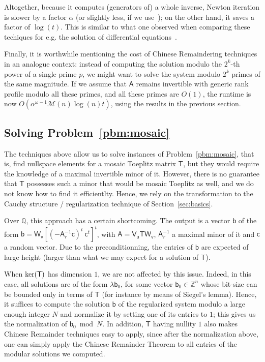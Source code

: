 \documentclass{sig-alternate}
\newcommand{\vb}{\ensuremath{\mathsf{b}}}
\newcommand{\vc}{\ensuremath{\mathsf{c}}}
\newcommand{\vu}{\ensuremath{\mathsf{u}}}
\newcommand{\vv}{\ensuremath{\mathsf{v}}}
\newcommand{\mA}{\ensuremath{\mathsf{A}}}
\newcommand{\mT}{\ensuremath{\mathsf{T}}}
\newcommand{\mV}{\ensuremath{\mathsf{V}}}
\newcommand{\mW}{\ensuremath{\mathsf{W}}}
\newcommand{\Q}{\ensuremath{\mathbb{Q}}}
\newcommand{\Z}{\ensuremath{\mathbb{Z}}}
\newcommand{\M}{\ensuremath{\mathscr{M}}}
\begin{document}
Altogether, because it computes (generators of) a whole inverse,
Newton iteration is slower by a factor $\alpha$ (or slightly less, if
we use~\cite{BoJeMoSc16}); on the other hand, it saves a factor of
$\log(t)$. This is similar to what one observed when comparing these
techiques for e.g. the solution of differential
equations~\cite{aaaa,bbb}. 

Finally, it is worthwhile mentioning the cost of Chinese Remaindering
techniques in an analogue context: instead of computing the solution
modulo the $2^k$-th power of a single prime $p$, we might want to 
solve the system modulo $2^k$ primes of the same magnitude. 
If we assume that $\mA$ remains invertible with generic rank profile modulo 
all these primes, and all these primes are $O(1)$, the runtime
is now $O(\alpha^{\omega-1} \M(n) \log(n) t)$, using the results 
in the previous section.


\subsection{Solving Problem~\ref{pbm:mosaic}}

The techniques above allow us to solve instances of
Problem~\ref{pbm:mosaic}, that is, find nullspace elements for a
mosaic Toeplitz matrix $\mT$, but they would require the knowledge of
a maximal invertible minor of it. However, there is no guarantee that
$\mT$ possesses such a minor that would be mosaic Toeplitz as well,
and we do not know how to find it efficientlty. Hence, we rely on the
transformation to the Cauchy structure / regularization technique
of Section~\ref{sec:basics}.

Over $\Q$, this approach has a certain shortcoming. The output is a
vector $\vb$ of the form $\vb=\mW_{\vv}[(-\mA_r^{-1}\vc)^t ~
  \vc^t]^t$, with $\mA=\mV_\vu \mT \mW_{\vv}$, $\mA_r^{-1}$ a maximal
minor of it and $\vc$ a random vector. Due to the preconditionning,
the entries of $\vb$ are expected of large height (larger than what we
may expect for a solution of $\mT$).

When ${\rm ker}(\mT)$ has dimension $1$, we are not affected by this
issue. Indeed, in this case, all solutions are of the form $\lambda
\vb_0$, for some vector $\vb_0 \in \Z^n$ whose bit-size can be bounded
only in terms of $\mT$ (for instance by means of Siegel's
lemma). Hence, it suffices to compute the solution $\vb$ of the
regularized system modulo a large enough integer $N$ and normalize it
by setting one of its entries to $1$; this gives us the normalization
of $\vb_0 \bmod N$. In addition, $\mT$ having nullity $1$ also makes
Chinese Remainder techniques easy to apply, since after the
normalization above, one can simply apply the Chinese Remainder
Theorem to all entries of the modular solutions we computed.






 {\scriptsize }
\end{document}
